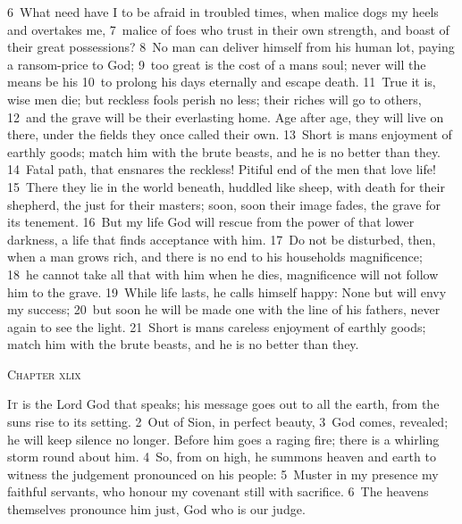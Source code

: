 \documentclass[10pt]{book} %
\begin{document}
\textcolor{benred8}{6}~What need have I to be afraid in troubled times, when malice dogs my heels and overtakes me, \textcolor{benred8}{7}~malice of foes who trust in their own strength, and boast of their great possessions? \textcolor{benred8}{8}~No man can deliver himself from his human lot, paying a ransom-price to God; \textcolor{benred8}{9}~too great is the cost of a man\textquotesingle s soul; never will the means be his \textcolor{benred8}{10}~to prolong his days eternally and escape death. \textcolor{benred8}{11}~True it is, wise men die; but reckless fools perish no less; their riches will go to others, \textcolor{benred8}{12}~and the grave will be their everlasting home. Age after age, they will live on there, under the fields they once called their own. \textcolor{benred8}{13}~Short is man\textquotesingle s enjoyment of earthly goods; match him with the brute beasts, and he is no better than they.
\textcolor{benred8}{14}~Fatal path, that ensnares the reckless! Pitiful end of the men that love life! \textcolor{benred8}{15}~There they lie in the world beneath, huddled like sheep, with death for their shepherd, the just for their masters; soon, soon their image fades, the grave for its tenement. \textcolor{benred8}{16}~But my life God will rescue from the power of that lower darkness, a life that finds acceptance with him. \textcolor{benred8}{17}~Do not be disturbed, then, when a man grows rich, and there is no end to his household\textquotesingle s magnificence; \textcolor{benred8}{18}~he cannot take all that with him when he dies, magnificence will not follow him to the grave. \textcolor{benred8}{19}~While life lasts, he calls himself happy: None but will envy my success; \textcolor{benred8}{20}~but soon he will be made one with the line of his fathers, never again to see the light. \textcolor{benred8}{21}~Short is man\textquotesingle s careless enjoyment of earthly goods; match him with the brute beasts, and he is no better than they.
\begin{large}\begin{center}\textsc{Chapter xlix}\end{center}\end{large}
\lettrine[lines=2]{I}{t} is the Lord God that speaks; his message goes out to all the earth, from the sun\textquotesingle s rise to its setting. \textcolor{benred8}{2}~Out of Sion, in perfect beauty, \textcolor{benred8}{3}~God comes, revealed; he will keep silence no longer. Before him goes a raging fire; there is a whirling storm round about him. \textcolor{benred8}{4}~So, from on high, he summons heaven and earth to witness the judgement pronounced on his people: \textcolor{benred8}{5}~Muster in my presence my faithful servants, who honour my covenant still with sacrifice. \textcolor{benred8}{6}~The heavens themselves pronounce him just, God who is our judge.
\end{document}

